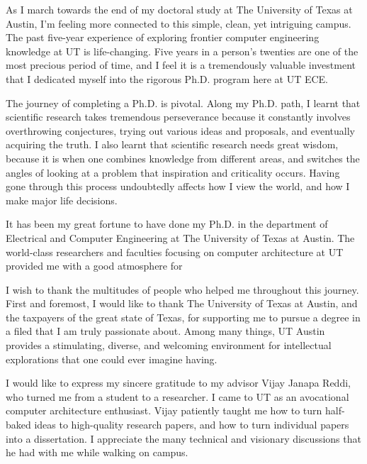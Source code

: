 
\begin{acknowledgments}		%

As I march towards the end of my doctoral study at The University of Texas at Austin, I'm feeling more connected to this simple, clean, yet intriguing campus. The past five-year experience of exploring frontier computer engineering knowledge at UT is life-changing. Five years in a person's twenties are one of the most precious period of time, and I feel it is a tremendously valuable investment that I dedicated myself into the rigorous Ph.D. program here at UT ECE.

The journey of completing a Ph.D. is pivotal. Along my Ph.D. path, I learnt that scientific research takes tremendous perseverance because it constantly involves overthrowing conjectures, trying out various ideas and proposals, and eventually acquiring the truth. I also learnt that scientific research needs great wisdom, because it is when one combines knowledge from different areas, and switches the angles of looking at a problem that inspiration and criticality occurs. Having gone through this process undoubtedly affects how I view the world, and how I make major life decisions. 

It has been my great fortune to have done my Ph.D. in the department of Electrical and Computer Engineering at The University of Texas at Austin. The world-class researchers and faculties focusing on computer architecture at UT provided me with a good atmosphere for 



% 



I wish to thank the multitudes of people who helped me throughout this journey. First and foremost, I would like to thank The University of Texas at Austin, and the taxpayers of the great state of Texas, for supporting me to pursue a degree in a filed that I am truly passionate about. Among many things, UT Austin provides a stimulating, diverse, and welcoming environment for intellectual explorations that one could ever imagine having.

I would like to express my sincere gratitude to my advisor Vijay Janapa Reddi, who turned me from a student to a researcher. I came to UT as an avocational computer architecture enthusiast. Vijay patiently taught me how to turn half-baked ideas to high-quality research papers, and how to turn individual papers into a dissertation. I appreciate the many technical and visionary discussions that he had with me while walking on campus.


\end{acknowledgments}

